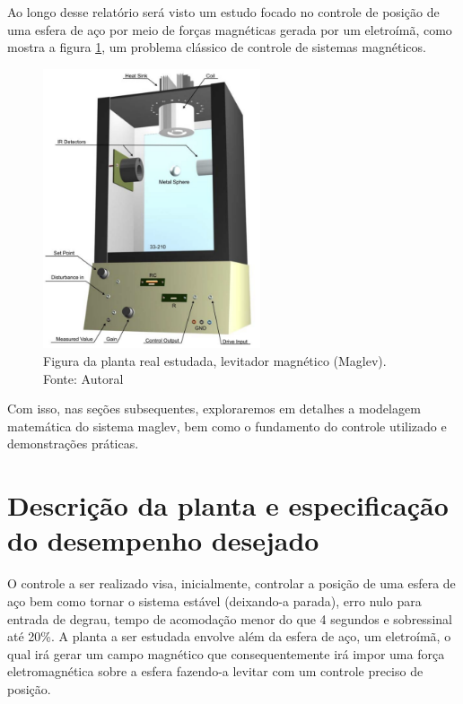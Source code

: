 \documentclass{ifacconf}
\begin{document}
Ao longo desse relatório será visto um estudo focado no controle de posição de uma esfera de aço por meio de forças magnéticas 
gerada por um eletroímã, como mostra a figura \ref{fig:planta_padrao}, um problema
clássico de controle de sistemas magnéticos. 

\begin{figure}[!htb]
  \begin{center}
  \includegraphics[width=6.4cm]{figures/planta_padrao.png}    %
  \caption{Figura da planta real estudada, levitador magnético (Maglev). Fonte: Autoral} 
  \label{fig:planta_padrao}
  \end{center}
\end{figure}

Com isso, nas seções subsequentes, exploraremos em detalhes a modelagem matemática do sistema
maglev, bem como o fundamento do controle utilizado e demonstrações práticas.

\section{Descrição da planta e especificação do desempenho desejado}

O controle a ser realizado visa, inicialmente, controlar a posição de uma esfera de aço bem como tornar o sistema estável (deixando-a parada), erro nulo para entrada de degrau, 
tempo de acomodação menor do que 4 segundos e sobressinal até 20\%.
A planta a ser estudada envolve além da esfera de aço, um eletroímã, o qual irá gerar um campo magnético que
consequentemente irá impor uma força eletromagnética sobre a esfera fazendo-a levitar com um controle preciso de posição.
\end{document}
